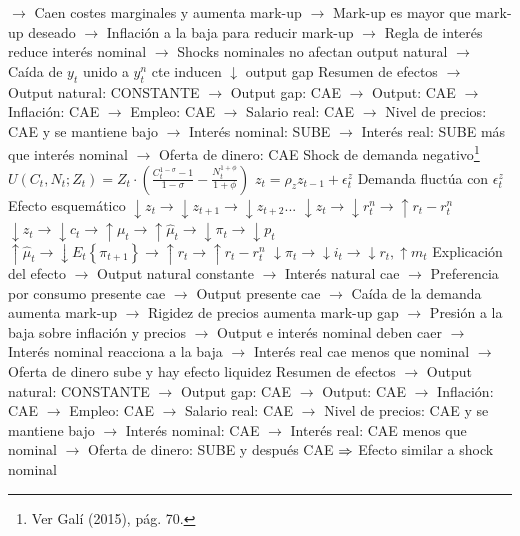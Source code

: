 \documentclass{nuevotema}
\begin{document}
\begin{esquemal}
				\4[] $\to$ Caen costes marginales y aumenta mark-up
				\4[] $\to$ Mark-up es mayor que mark-up deseado
				\4[] $\to$ Inflación a la baja para reducir mark-up
				\4[] $\to$ Regla de interés reduce interés nominal
				\4[] $\to$ Shocks nominales no afectan output natural
				\4[] $\to$ Caída de $y_t$ unido a $y_t^n$ cte inducen $\downarrow$ output gap
				\4[] Resumen de efectos
				\4[] $\to$ Output natural: CONSTANTE
				\4[] $\to$ Output gap: CAE
				\4[] $\to$ Output: CAE
				\4[] $\to$ Inflación: CAE
				\4[] $\to$ Empleo: CAE
				\4[] $\to$ Salario real: CAE
				\4[] $\to$ Nivel de precios: CAE y se mantiene bajo
				\4[] $\to$ Interés nominal: SUBE
				\4[] $\to$ Interés real: SUBE más que interés nominal
				\4[] $\to$ Oferta de dinero: CAE
				\4[] 
				\4 Shock de demanda negativo\footnote{Ver Galí (2015), pág. 70.}
				\4[] $U(C_t, N_t; Z_t) = Z_t \cdot \left( \frac{C_t^{1-\sigma} - 1}{1-\sigma} - \frac{N_t^{1+\phi}}{1+\phi} \right)$
				\4[] $z_t = \rho_z z_{t-1} + \epsilon_t^z$
				\4[] Demanda fluctúa con $\epsilon_t^z$
				\4[] Efecto esquemático
				\4[] $\downarrow z_t \to \downarrow z_{t+1} \to \downarrow z_{t+2}...$
				\4[] $\downarrow z_t \to \downarrow r_t^n \to \uparrow r_t - r_t^n$
				\4[] $\downarrow z_t \to \downarrow c_t \to \uparrow \mu_t \to \uparrow \hat{\mu}_t \to \downarrow \pi_t \to \downarrow p_t$
				\4[] $\uparrow \hat{\mu}_t \to \downarrow E_t\left\lbrace \pi_{t+1} \right\rbrace \to \uparrow r_t \to \uparrow r_t - r_t^n$
				\4[] $\downarrow \pi_t \to \downarrow i_t \to \downarrow r_t, \uparrow m_t$
				\4[] Explicación del efecto
				\4[] $\to$ Output natural constante
				\4[] $\to$ Interés natural cae
				\4[] $\to$ Preferencia por consumo presente cae
				\4[] $\to$ Output presente cae
				\4[] $\to$ Caída de la demanda aumenta mark-up
				\4[] $\to$ Rigidez de precios aumenta mark-up gap
				\4[] $\to$ Presión a la baja sobre inflación y precios
				\4[] $\to$ Output e interés nominal deben caer
				\4[] $\to$ Interés nominal reacciona a la baja
				\4[] $\to$ Interés real cae menos que nominal
				\4[] $\to$ Oferta de dinero sube y hay efecto liquidez
				\4[] Resumen de efectos
				\4[] $\to$ Output natural: CONSTANTE
				\4[] $\to$ Output gap: CAE
				\4[] $\to$ Output: CAE
				\4[] $\to$ Inflación: CAE
				\4[] $\to$ Empleo: CAE
				\4[] $\to$ Salario real: CAE
				\4[] $\to$ Nivel de precios: CAE y se mantiene bajo
				\4[] $\to$ Interés nominal: CAE
				\4[] $\to$ Interés real: CAE menos que nominal
				\4[] $\to$ Oferta de dinero: SUBE y después CAE
				\4[] $\Rightarrow$ Efecto similar a shock nominal

\end{esquemal}
\end{document}
